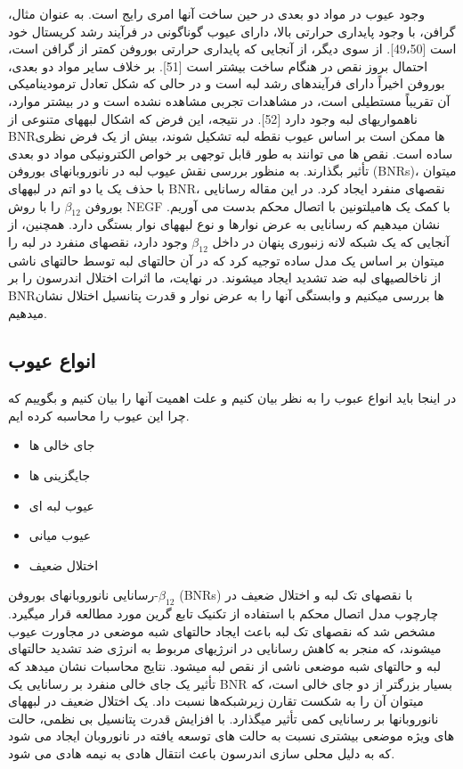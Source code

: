 وجود عیوب در مواد دو بعدی در حین ساخت آنها امری رایج است. به عنوان مثال، گرافن، با وجود پایداری حرارتی بالا، دارای عیوب گوناگونی در فرآیند رشد کریستال خود است [49،50]. از سوی دیگر، از آنجایی که پایداری حرارتی بوروفن کمتر از گرافن است، احتمال بروز نقص در هنگام ساخت بیشتر است [51]. بر خلاف سایر مواد دو بعدی، بوروفن اخیراً دارای فرآیندهای رشد لبه است و در حالی که شکل تعادل ترمودینامیکی آن تقریباً مستطیلی است، در مشاهدات تجربی مشاهده نشده است و در بیشتر موارد، ناهمواریهای لبه وجود دارد [52]. در نتیجه، این فرض که اشکال لبههای متنوعی از BNRها ممکن است بر اساس عیوب نقطه لبه تشکیل شوند، بیش از یک فرض نظری ساده است. نقص ها می توانند به طور قابل توجهی بر خواص الکترونیکی مواد دو بعدی تأثیر بگذارند. به منظور بررسی نقش عیوب لبه در نانوروبانهای بوروفن (BNRs)، میتوان با حذف یک یا دو اتم در لبههای BNR، نقصهای منفرد ایجاد کرد. در این مقاله رسانایی بوروفن $\beta_{12}$ را با روش NEGF با کمک یک هامیلتونین با اتصال محکم بدست می آوریم. نشان میدهیم که رسانایی به عرض نوارها و نوع لبههای نوار بستگی دارد. همچنین، از آنجایی که یک شبکه لانه زنبوری پنهان در داخل $\beta_{12}$ وجود دارد، نقصهای منفرد در لبه را میتوان بر اساس یک مدل ساده توجیه کرد که در آن حالتهای لبه توسط حالتهای ناشی از ناخالصیهای لبه ضد تشدید ایجاد میشوند. در نهایت، ما اثرات اختلال اندرسون را بر BNRها بررسی میکنیم و وابستگی آنها را به عرض نوار و قدرت پتانسیل اختلال نشان میدهیم.
\subsection{انواع عیوب}
در اینجا باید انواع عبوب را به نظر بیان کنیم و علت اهمیت آنها را بیان کنیم و بگوییم که چرا این عیوب را محاسبه کرده ایم.
\begin{itemize}
  \item جای خالی ها
  \item جایگزینی ها
  \item عیوب لبه ای
  \item عیوب میانی
  \item اختلال ضعیف
\end{itemize}
رسانایی نانوروبانهای بوروفن-$\beta_{12}$ (BNRs) با نقصهای تک لبه و اختلال ضعیف در چارچوب مدل اتصال محکم با استفاده از تکنیک تابع گرین مورد مطالعه قرار میگیرد. مشخص شد که نقصهای تک لبه باعث ایجاد حالتهای شبه موضعی در مجاورت عیوب میشوند، که منجر به کاهش رسانایی در انرژیهای مربوط به انرژی ضد تشدید حالتهای لبه و حالتهای شبه موضعی ناشی از نقص لبه میشود. نتایج محاسبات نشان میدهد که تأثیر یک جای خالی منفرد بر رسانایی یک BNR بسیار بزرگتر از دو جای خالی است، که میتوان آن را به شکست تقارن زیرشبکه‌ها نسبت داد. یک اختلال ضعیف در لبههای نانوروبانها بر رسانایی کمی تأثیر میگذارد. با افزایش قدرت پتانسیل بی نظمی، حالت های ویژه موضعی بیشتری نسبت به حالت های توسعه یافته در نانوروبان ایجاد می شود که به دلیل محلی سازی اندرسون باعث انتقال هادی به نیمه هادی می شود.

